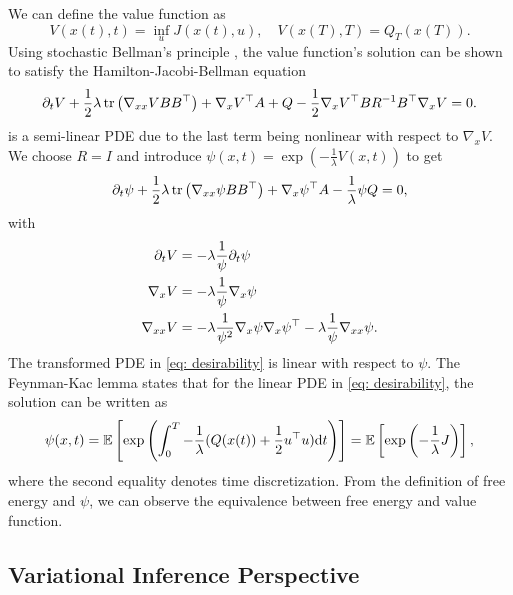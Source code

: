 \documentclass[twoside,11pt]{article}
\begin{document}
We can define the value function as
\begin{equation}
V(x(t),t) = \inf_u J(x(t),u), \quad V(x(T), T) = Q_T(x(T)).
\end{equation}
Using stochastic Bellman's principle \citep{yong1999stochastic}, the value function's solution can be shown to satisfy the Hamilton-Jacobi-Bellman equation
\begin{equation}\label{eq: hjb}
\partial_t V + \frac{1}{2}\lambda\operatorname{\rm{tr}}\left(\nabla_{xx}VBB^\top\right) + \nabla_x V^\top A + Q - \frac{1}{2}\nabla_xV^\top B R^{-1} B^\top\nabla_x V = 0.
\end{equation}
 is a semi-linear PDE due to the last term being nonlinear with respect to $\nabla_x V$. We choose $R=I$ and introduce $\psi(x,t)=\exp(-\frac{1}{\lambda}V(x,t))$ to get
\begin{equation}\label{eq: desirability}
\partial_t \psi + \frac{1}{2}\lambda\operatorname{\rm{tr}}\left(\nabla_{xx}\psi B B^\top\right) + \nabla_x \psi^\top A - \frac{1}{\lambda} \psi Q = 0,
\end{equation}
with
\begin{equation*}
\begin{split}
\partial_t V &= -\lambda \frac{1}{\psi} \partial_t \psi\\
\nabla_x V &= -\lambda \frac{1}{\psi} \nabla_x \psi\\
\nabla_{xx} V &= -\lambda \frac{1}{\psi^2} \nabla_x \psi \nabla_x \psi^\top - \lambda \frac{1}{\psi} \nabla_{xx} \psi.
\end{split}
\end{equation*}
The transformed PDE in \cref{eq: desirability} is linear with respect to $\psi$. The Feynman-Kac lemma \citep{friedman2010stochastic} states that for the linear PDE in \cref{eq: desirability}, the solution can be written as
\begin{equation}\label{eq: feyman_kac_solution}
\psi(x, t) = \mathbb{E}\left[\exp\left(\int_0^T -\frac{1}{\lambda}(Q(x(t)) + \frac{1}{2}u^\top u) {\mathrm d} t\right)\right]=\mathbb{E}\left[\exp\left(-\frac{1}{\lambda}J\right)\right],
\end{equation}
where the second equality denotes time discretization. From the definition of free energy and $\psi$, we can observe the equivalence between free energy and value function.

\subsection{Variational Inference Perspective}
\label{sec: vi}
\end{document}
